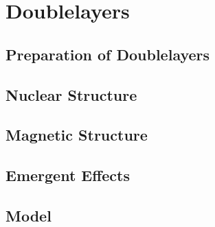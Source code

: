 \documentclass[\main/dresen_thesis.tex]{subfiles}
\begin{document}
\chapter{Doublelayers}\label{ch:doublelayers}

\section{Preparation of Doublelayers}

\section{Nuclear Structure}

\section{Magnetic Structure}

\section{Emergent Effects}

\section{Model}
\end{document}
